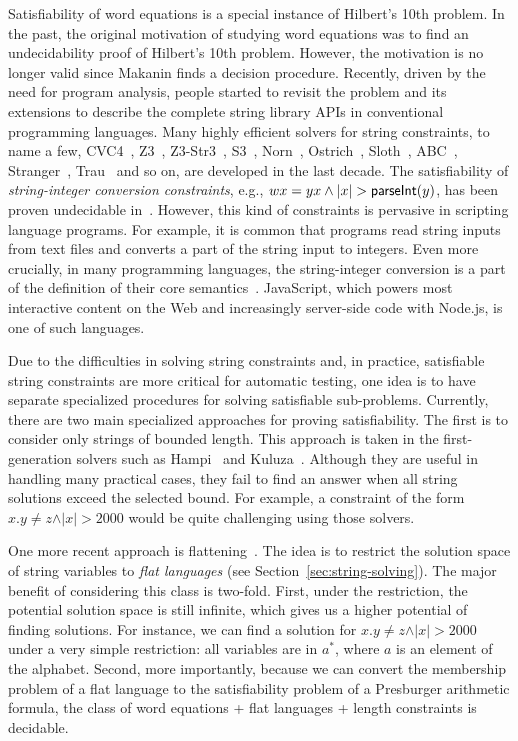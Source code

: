 Satisfiability of word equations is a special instance of Hilbert’s 10th problem. 
In the past, the original motivation of studying word equations was to find an undecidability proof of Hilbert’s 10th problem. 
However, the motivation is no longer valid since Makanin finds a decision procedure. Recently, driven by the need for program analysis, people started to revisit the problem and its extensions to describe the complete string library APIs in conventional programming languages. Many highly efficient solvers for string constraints, to name a few, CVC4~\cite{cvc4Tool}, Z3~\cite{z3}, Z3-Str3~\cite{zheng2013z3}, S3~\cite{trinh2014s3}, Norn~\cite{abdulla2015norn}, Ostrich~\cite{chen2017decidable}, Sloth~\cite{sloth}, ABC~\cite{aydin2018parameterized}, Stranger~\cite{yu2010stranger}, Trau~\cite{abdulla2018trau} and so on, are developed in the last decade.
The satisfiability of \emph{string-integer conversion constraints}, e.g., $wx=yx \wedge \vert x\vert  > \textsf{parseInt}(y)$, has been proven undecidable in~\cite{DayGHMN18}. 
However, this kind of constraints is pervasive in scripting language programs. 
For example, it is common that programs read string inputs from text files and converts a part of the string input to integers.
Even more crucially, in many programming languages, the string-integer conversion is a part of the definition of their core semantics~\cite{ecmascript2019ecmascript}. 
JavaScript, which powers most interactive content on the Web and increasingly server-side code with Node.js, is one of such languages. 

Due to the difficulties in solving string constraints and, in practice, satisfiable string constraints are more critical for automatic testing, one idea is to have separate specialized procedures for solving satisfiable sub-problems. 
Currently, there are two main specialized approaches for proving satisfiability.
The first is to consider only strings of bounded length.
This approach is taken in the first-generation solvers such as Hampi~\cite{KiezunGAGHE12} and Kuluza~\cite{SaxenaAHMMS10}.
Although they are useful in handling many practical cases, they fail to find an answer when all string solutions exceed the selected bound.
For example, a constraint of the form $x.y \neq z  \wedge \vert x\vert  > 2000$ would be quite challenging using those solvers.

One more recent approach is flattening~\cite{Parosh:20:PLDI,AbdullaACDHRR18,AbdullaACDHRR17}.
The idea is to restrict the solution space of string variables to 
\emph{flat languages} (see Section~\ref{sec:string-solving}). 
The major benefit of considering this class is two-fold.
First, under the restriction, the potential solution space is still infinite, which gives us a higher potential of finding solutions.
For instance, we can find a solution for $x.y \neq z  \wedge \vert x\vert  > 2000$ under a very simple restriction: all variables are in $a^*$, where $a$ is an element of the alphabet.
Second, more importantly, because we can convert the membership problem of a flat language to the satisfiability problem of a Presburger arithmetic formula, the class of word equations + flat languages + length constraints is decidable.

